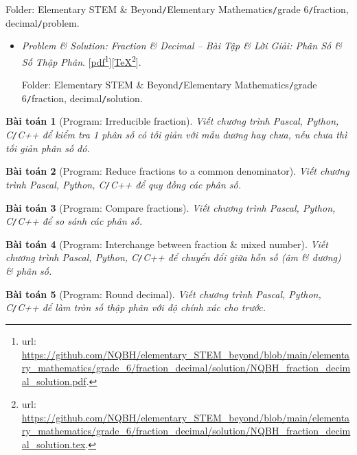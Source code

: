 \documentclass[12pt,twoside]{book}
\newtheorem{baitoan}{Bài toán}
\begin{document}
\begin{enumerate}
	Folder: {\sf Elementary STEM \& Beyond{\tt/}Elementary Mathematics{\tt/}grade 6{\tt/}fraction, decimal{\tt/}problem}.
	\begin{itemize}
		\item {\it Problem \& Solution: Fraction \& Decimal -- Bài Tập \& Lời Giải: Phân Số {\it\&} Số Thập Phân}. [\href{https://github.com/NQBH/elementary_STEM_beyond/blob/main/elementary_mathematics/grade_6/fraction_decimal/solution/NQBH_fraction_decimal_solution.pdf}{pdf}\footnote{{\sc url}: \url{https://github.com/NQBH/elementary_STEM_beyond/blob/main/elementary_mathematics/grade_6/fraction_decimal/solution/NQBH_fraction_decimal_solution.pdf}.}][\href{https://github.com/NQBH/elementary_STEM_beyond/blob/main/elementary_mathematics/grade_6/fraction_decimal/solution/NQBH_fraction_decimal_solution.tex}{\TeX}\footnote{{\sc url}: \url{https://github.com/NQBH/elementary_STEM_beyond/blob/main/elementary_mathematics/grade_6/fraction_decimal/solution/NQBH_fraction_decimal_solution.tex}.}].
		
		Folder: {\sf Elementary STEM \& Beyond{\tt/}Elementary Mathematics{\tt/}grade 6{\tt/}fraction, decimal{\tt/}solution}.
	\end{itemize}
	
	\begin{baitoan}[{\sf Program}: Irreducible fraction]
		Viết chương trình {\sf Pascal, Python, C{\tt/}C++} để kiểm tra 1 phân số có tối giản với mẫu dương hay chưa, nếu chưa thì tối giản phân số đó.
	\end{baitoan}
	
	\begin{baitoan}[{\sf Program}: Reduce fractions to a common denominator]
		Viết chương trình {\sf Pascal, Python, C{\tt/}C++} để quy đồng các phân số.
	\end{baitoan}
	
	\begin{baitoan}[{\sf Program}: Compare fractions]
		Viết chương trình {\sf Pascal, Python, C{\tt/}C++} để so sánh các phân số.
	\end{baitoan}
	
	\begin{baitoan}[{\sf Program}: Interchange between fraction \& mixed number]
		Viết chương trình {\sf Pascal, Python, C{\tt/}C++} để chuyển đổi giữa hỗn số (âm \& dương) \& phân số.
	\end{baitoan}
	
	\begin{baitoan}[{\sf Program}: Round decimal]
		Viết chương trình {\sf Pascal, Python, C{\tt/}C++} để làm tròn số thập phân với độ chính xác cho trước.
	\end{baitoan}
	

\end{enumerate}
\end{document}
